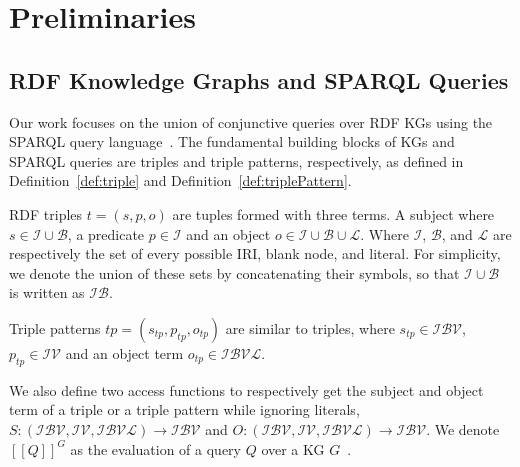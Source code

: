\section{Preliminaries}\label{sec:preliminaries}

\subsection{RDF Knowledge Graphs and SPARQL Queries}

Our work focuses on the union of conjunctive queries over \ac{RDF} \acp{KG} using the SPARQL query language~\cite{w3SPARQLQuery}.
The fundamental building blocks of \acp{KG} and SPARQL queries are triples and triple patterns, respectively, as defined in Definition~\ref{def:triple} and Definition~\ref{def:triplePattern}.

\begin{definition}[Triple]\label{def:triple}
	\ac{RDF} triples $t = (s,p,o)$ are tuples formed with three terms. A subject where $s \in \mathcal{I} \cup \mathcal{B}$, a predicate $p \in \mathcal{I}$ and an object $o \in \mathcal{I} \cup \mathcal{B} \cup \mathcal{L}$.
	Where $\mathcal{I}$, $\mathcal{B}$, and $\mathcal{L}$ are respectively the set of every possible \ac{IRI}, blank node, and literal.
	For simplicity, we denote the union of these sets by concatenating their symbols, so that $ \mathcal{I} \cup \mathcal{B}$ is written as $ \mathcal{I} \mathcal{B}$.
\end{definition}

\begin{definition}\label{def:triplePattern}
	Triple patterns $tp = (s_{tp}, p_{tp}, o_{tp})$ are similar to triples,  where $s_{tp} \in \mathcal{I} \mathcal{B} \mathcal{V}$,
	$p_{tp} \in \mathcal{I} \mathcal{V}$ and an object term  $o_{tp} \in \mathcal{I} \mathcal{B} \mathcal{V} \mathcal{L}$.
\end{definition}

We also define two access functions to respectively get the subject and object term of a triple or a triple pattern while ignoring literals,
$ S:  (\mathcal{I} \mathcal{B} \mathcal{V}, \mathcal{I} \mathcal{V}, \mathcal{I} \mathcal{B} \mathcal{V} \mathcal{L}) \rightarrow \mathcal{I} \mathcal{B} \mathcal{V}$ and $O: (\mathcal{I} \mathcal{B} \mathcal{V}, \mathcal{I} \mathcal{V}, \mathcal{I} \mathcal{B} \mathcal{V} \mathcal{L}) \rightarrow \mathcal{I} \mathcal{B} \mathcal{V}$.
We denote $[\![ Q ]\!]^{G}$ as the evaluation of a query $Q$ over a \ac{KG} $G$~\cite{Angles2008}.

